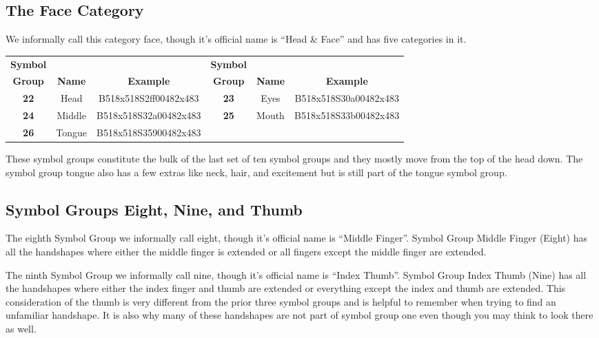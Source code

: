 \documentclass{article}
\begin{document}
\subsection{The Face Category}

We informally call this category face, though it's official name is ``Head \& Face'' and has five categories in it.

\begin{center}
\begin{tabular}{ccc@{\hskip 5mm}ccc}
\textbf{Symbol}&&&\textbf{Symbol}\\
\textbf{Group}&\textbf{Name}&\textbf{Example}&\textbf{Group}&\textbf{Name}&\textbf{Example}\\
\textbf{22}&Head  &B518x518S2ff00482x483&\textbf{23}&Eyes &B518x518S30a00482x483\\
\textbf{24}&Middle&B518x518S32a00482x483&\textbf{25}&Mouth&B518x518S33b00482x483\\
\textbf{26}&Tongue&B518x518S35900482x483\\
\end{tabular}
\end{center}

These symbol groups constitute the bulk of the last set of ten symbol groups and they mostly move from the top of the head down.
The symbol group tongue also has a few extras like neck, hair, and excitement but is still part of the tongue symbol group.

\subsection{Symbol Groups Eight, Nine, and Thumb}

The eighth Symbol Group we informally call eight, though it's official name is ``Middle Finger''.
Symbol Group Middle Finger (Eight) has all the handshapes where either the middle finger is extended or all fingers except the middle finger are extended.

The ninth Symbol Group we informally call nine, though it's official name is ``Index Thumb''.
Symbol Group Index Thumb (Nine) has all the handshapes where either the index finger and thumb are extended or everything except the index and thumb are extended.
This consideration of the thumb is very different from the prior three symbol groups and is helpful to remember when trying to find an unfamiliar handshape.
It is also why many of these handshapes are not part of symbol group one even though you may think to look there as well.
\end{document}
